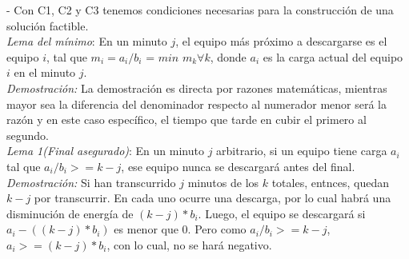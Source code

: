 \documentclass{article}
\begin{document}
- Con C1, C2 y C3 tenemos condiciones necesarias para la construcci\'on de una soluci\'on factible.\\

\textit{Lema del m\'inimo}: En un minuto $j$, el equipo m\'as pr\'oximo a descargarse es el equipo $i$, tal que $m_i = a_i/b_i$ = $min$ $m_k \forall k$, donde $a_i$ es la carga actual del equipo $i$ en el minuto $j$.\\
\textit{Demostraci\'on:} La demostraci\'on es directa por razones matem\'aticas, mientras mayor sea la diferencia del denominador respecto al numerador menor ser\'a la raz\'on y en este caso espec\'ifico, el tiempo que tarde en cubir el primero al segundo.\\

\textit{Lema 1(Final asegurado)}: En un minuto $j$ arbitrario, si un equipo tiene carga $a_i$ tal que $a_i/b_i >= k-j$, ese equipo nunca se descargar\'a antes del final.\\
\textit{Demostraci\'on:} Si han transcurrido $j$ minutos de los $k$ totales, entnces, quedan $k-j$ por transcurrir. En cada uno ocurre una descarga, por lo cual habr\'a una disminuci\'on de energ\'ia de $(k-j)*b_i$. Luego, el equipo se descargar\'a si $a_i - ((k-j)*b_i)$ es menor que 0. Pero como $a_i/b_i >= k-j$, $a_i>=(k-j)*b_i$, con lo cual, no se har\'a negativo.\\ 
\end{document}
